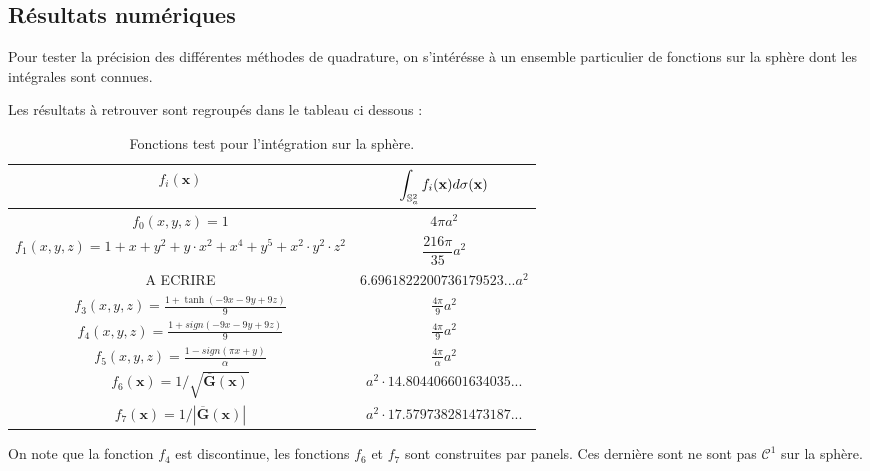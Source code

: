 \subsection{Résultats numériques} %

Pour tester la précision des différentes méthodes de quadrature, on s'intérésse à un ensemble particulier de fonctions sur la sphère dont les intégrales sont connues.

Les résultats à retrouver sont regroupés dans le tableau ci dessous :

\begin{table}[ht]
\begin{center}
\begin{tabular}{|c|c|}
\hline
$f_i(\mathbf{x})$   &   $\displaystyle\int_{\mathbb{S}_a^2} f_i(\mathbf{x}) d\sigma (\mathbf{x})$ \\
\hline
\hline
$f_0(x,y,z)=1$ & $4 \pi a^2$ \\
\hline
$f_1(x,y,z)=1+x+y^2+y\cdot x^2+x^4+y^5+x^2 \cdot y^2 \cdot z^2$ & $\dfrac{216 \pi}{35} a^2$ \\
\hline
A ECRIRE & $6.6961822200736179523...  a^2$ \\
\hline
$f_3(x,y,z)=\frac{1+\tanh(-9x-9y+9z)}{9}$ & $\frac{4\pi}{9} a^2$\\
\hline
$f_4(x,y,z)=\frac{1+sign(-9x-9y+9z)}{9}$ & $\frac{4\pi}{9} a^2$\\
\hline
$f_5(x,y,z)=\frac{1-sign(\pi x + y)}{\alpha}$ & $\frac{4\pi}{\alpha} a^2$ \\
\hline
$f_6(\mathbf{x}) = 1/\sqrt{\overline{\mathbf{G}}(\mathbf{x})}$ & $a^2 \cdot 14.804406601634035... $ \\
\hline
$f_7(\mathbf{x}) = 1/|\overline{\mathbf{G}}(\mathbf{x})|$ & $a^2 \cdot 17.579738281473187...$ \\
\hline
\end{tabular}
\end{center}
\caption{Fonctions test pour l'intégration sur la sphère.}
\end{table}

\begin{remarque}
On note que la fonction $f_4$ est discontinue, les fonctions $f_6$ et $f_7$ sont construites par panels. Ces dernière sont ne sont pas $\mathcal{C}^1$ sur la sphère.
\end{remarque}



























